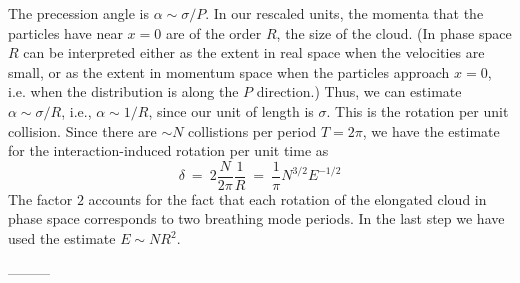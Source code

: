\documentclass[aps,preprintnumbers,onecolumn,amsmath,amssymb,floatfix,pra]{revtex4-1}
\begin{document}
The precession angle is $\alpha\sim \sigma/P$.  In our rescaled units, the momenta that the
particles have near $x=0$ are of the order $R$, the size of the cloud.  (In phase space $R$ can be
interpreted either as the extent in real space when the velocities are small, or as the extent in
momentum space when the particles approach $x=0$, i.e. when the distribution is along the $P$
direction.)  Thus, we can estimate  $\alpha\sim \sigma/R$, i.e.,   $\alpha\sim 1/R$, since our unit
of length is $\sigma$.  This is the rotation per unit collision.  Since there are $\sim N$
collistions per period $T=2\pi$, we have the estimate for the interaction-induced rotation per unit
time as
\begin{equation}
\delta ~=~ 2 \frac{N}{2\pi} \frac{1}{R} ~=~  \frac{1}{\pi}  N^{3/2}E^{-1/2}
\label{eq:breathingfrequency1}
\end{equation}
The factor $2$ accounts for the fact that each rotation of the elongated cloud in phase space
corresponds to two breathing mode periods.  In the last step we have used the estimate $E\sim
NR^2$. 



---------









\end{document}
